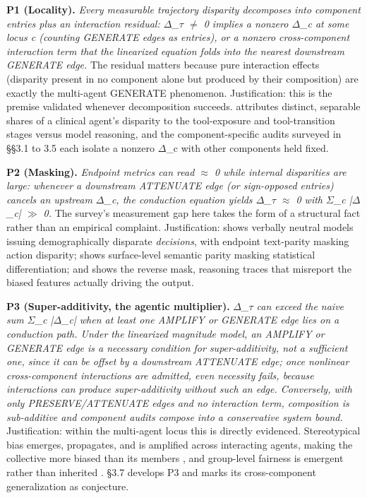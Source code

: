 \documentclass[10pt]{article}
\begin{document}
\textbf{P1 (Locality).} \emph{Every measurable trajectory disparity decomposes into component entries plus an interaction residual: $\Delta$\_$\tau$ $\neq$ 0 implies a nonzero $\Delta$\_c at some locus c (counting GENERATE edges as entries), or a nonzero cross-component interaction term that the linearized equation folds into the nearest downstream GENERATE edge.} The residual matters because pure interaction effects (disparity present in no component alone but produced by their composition) are exactly the multi-agent GENERATE phenomenon. Justification: this is the premise validated whenever decomposition succeeds. \cite{xu2026ducx} attributes distinct, separable shares of a clinical agent's disparity to the tool-exposure and tool-transition stages versus model reasoning, and the component-specific audits surveyed in \S{}\S{}3.1 to 3.5 each isolate a nonzero $\Delta$\_c with other components held fixed.

\textbf{P2 (Masking).} \emph{Endpoint metrics can read $\approx$ 0 while internal disparities are large: whenever a downstream ATTENUATE edge (or sign-opposed entries) cancels an upstream $\Delta$\_c, the conduction equation yields $\Delta$\_$\tau$ $\approx$ 0 with $\Sigma$\_c |$\Delta$\_c| $\gg$ 0.} The survey's measurement gap here takes the form of a structural fact rather than an empirical complaint. Justification: \cite{li2025actions} shows verbally neutral models issuing demographically disparate \emph{decisions}, with endpoint text-parity masking action disparity; \cite{xu2025quantifying} shows surface-level semantic parity masking statistical differentiation; and \cite{turpin2023language} shows the reverse mask, reasoning traces that misreport the biased features actually driving the output.

\textbf{P3 (Super-additivity, the agentic multiplier).} \emph{$\Delta$\_$\tau$ can exceed the naive sum $\Sigma$\_c |$\Delta$\_c| when at least one AMPLIFY or GENERATE edge lies on a conduction path. Under the linearized magnitude model, an AMPLIFY or GENERATE edge is a necessary condition for super-additivity, not a sufficient one, since it can be offset by a downstream ATTENUATE edge; once nonlinear cross-component interactions are admitted, even necessity fails, because interactions can produce super-additivity without such an edge. Conversely, with only PRESERVE/ATTENUATE edges and no interaction term, composition is sub-additive and component audits compose into a conservative system bound.} Justification: within the multi-agent locus this is directly evidenced. Stereotypical bias emerges, propagates, and is amplified across interacting agents, making the collective more biased than its members \cite{nguyen2025social}, and group-level fairness is emergent rather than inherited \cite{madigan2025emergent}. \S{}3.7 develops P3 and marks its cross-component generalization as conjecture.
\end{document}
